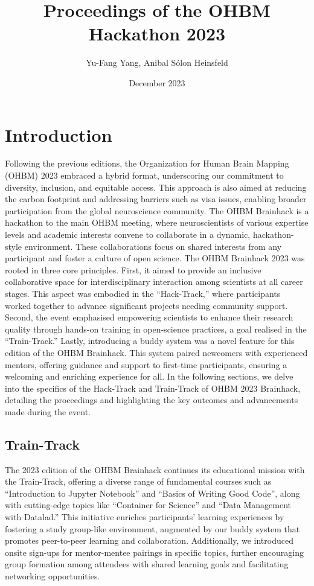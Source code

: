 \documentclass{article}
\title{Proceedings of the OHBM Hackathon 2023}
\author{Yu-Fang Yang, Anibal Sólon Heinsfeld}
\date{December 2023}
\begin{document}
\maketitle

\section{Introduction}

Following the previous editions, the Organization for Human Brain Mapping (OHBM) 2023 embraced a hybrid format, underscoring our commitment to diversity, inclusion, and equitable access.
This approach is also aimed at reducing the carbon footprint and addressing barriers such as visa issues, enabling broader participation from the global neuroscience community.
The OHBM Brainhack is a hackathon to the main OHBM meeting, where neuroscientists of various expertise levels and academic interests convene to collaborate in a dynamic, hackathon-style environment.
These collaborations focus on shared interests from any participant and foster a culture of open science.
The OHBM Brainhack 2023 was rooted in three core principles.
First, it aimed to provide an inclusive collaborative space for interdisciplinary interaction among scientists at all career stages.
This aspect was embodied in the “Hack-Track,” where participants worked together to advance significant projects needing community support.
Second, the event emphasised empowering scientists to enhance their research quality through hands-on training in open-science practices, a goal realised in the “Train-Track.” Lastly, introducing a buddy system was a novel feature for this edition of the OHBM Brainhack.
This system paired newcomers with experienced mentors, offering guidance and support to first-time participants, ensuring a welcoming and enriching experience for all.
In the following sections, we delve into the specifics of the Hack-Track and Train-Track of OHBM 2023 Brainhack, detailing the proceedings and highlighting the key outcomes and advancements made during the event.

\subsection{Train-Track}

The 2023 edition of the OHBM Brainhack continues its educational mission with the Train-Track, offering a diverse range of fundamental courses such as “Introduction to Jupyter Notebook” and “Basics of Writing Good Code”, along with cutting-edge topics like “Container for Science” and “Data Management with Datalad.”
This initiative enriches participants' learning experiences by fostering a study group-like environment, augmented by our buddy system that promotes peer-to-peer learning and collaboration.
Additionally, we introduced onsite sign-ups for mentor-mentee pairings in specific topics, further encouraging group formation among attendees with shared learning goals and facilitating networking opportunities.
\end{document}
